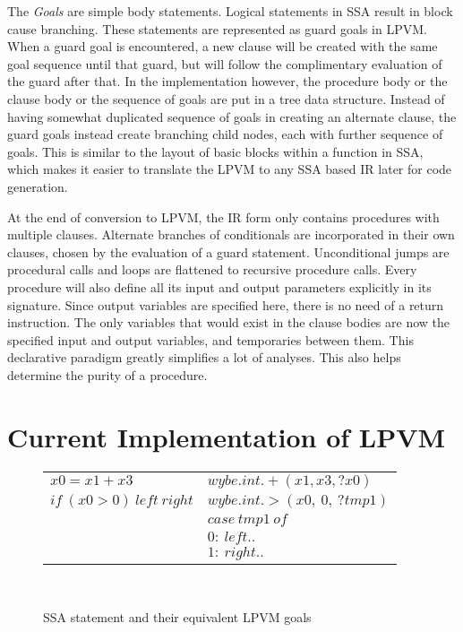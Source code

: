 The \textit{Goals} are simple body statements. Logical statements in SSA result
in block cause branching. These statements are represented as guard goals in
LPVM. When a guard goal is encountered, a new clause will be created with the
same goal sequence until that guard, but will follow the complimentary
evaluation of the guard after that. In the implementation however, the
procedure body or the clause body or the sequence of goals are put in a tree
data structure. Instead of having somewhat duplicated sequence of goals in
creating an alternate clause, the guard goals instead create branching child
nodes, each with further sequence of goals. This is similar to the layout of
basic blocks within a function in SSA, which makes it easier to translate the
LPVM to any SSA based IR later for code generation. 

At the end of conversion to LPVM, the IR form only contains procedures with
multiple clauses. Alternate branches of conditionals are incorporated in their
own clauses, chosen by the evaluation of a guard statement. Unconditional jumps
are procedural calls and loops are flattened to recursive procedure
calls. Every procedure will also define all its input and output parameters
explicitly in its signature. Since output variables are specified here, there
is no need of a return instruction. The only variables that would exist in the
clause bodies are now the specified input and output variables, and temporaries
between them. This declarative paradigm greatly simplifies a lot of
analyses. This also helps determine the purity of a procedure. 


\section{Current Implementation of LPVM}


\begin{figure}
\centering
\begin{tabular}{l@{\hskip 1in} l}
  \( x0 = x1 + x3 \)              & \( wybe.int.+(x1, x3, ?x0) \) \\
  \( if\ (x0 > 0)\ left\ right \) & \( wybe.int.>(x0,\ 0,\ ?tmp1) \) \\
                                  & \( case\ tmp1\ of \) \\
                                  & \( 0:\ left.. \) \\
                                  & \( 1:\ right.. \) \\
                                

\end{tabular}
\\
\caption{SSA statement and their equivalent LPVM goals}
\end{figure}

